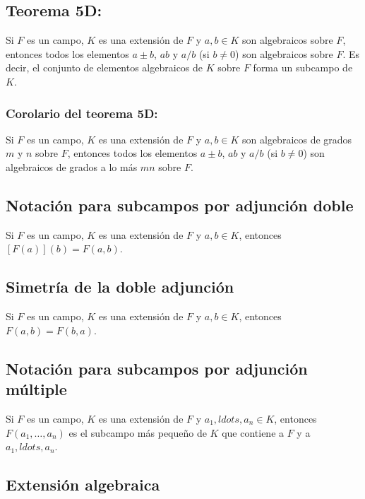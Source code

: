 \documentclass{article}
\begin{document}
\subsection*{\color{red} Teorema 5D:}

Si $F$ es un campo, $K$ es una extensión de $F$ y $a,b\in K$ son algebraicos sobre $F$, entonces todos los elementos $a\pm b$, $ab$ y $a/b$ (si $b\neq0$) son algebraicos sobre $F$. Es decir, el conjunto de elementos algebraicos de $K$ sobre $F$ forma un subcampo de $K$.

\subsubsection*{\color{red} Corolario del teorema 5D:}

Si $F$ es un campo, $K$ es una extensión de $F$ y $a,b\in K$ son algebraicos de grados $m$ y $n$ sobre $F$, entonces todos los elementos $a\pm b$, $ab$ y $a/b$ (si $b\neq0$) son algebraicos de grados a lo más $mn$ sobre $F$.

\subsection*{\color{teal} Notación para subcampos por adjunción doble}

Si $F$ es un campo, $K$ es una extensión de $F$ y $a,b\in K$, entonces $[F(a)](b)=F(a,b)$.

\subsection*{\color{purple} Simetría de la doble adjunción}

Si $F$ es un campo, $K$ es una extensión de $F$ y $a,b\in K$, entonces $F(a,b)=F(b,a)$.

\subsection*{\color{teal} Notación para subcampos por adjunción múltiple}

Si $F$ es un campo, $K$ es una extensión de $F$ y $a_1,ldots,a_n\in K$, entonces $F(a_1,\ldots,a_n)$ es el subcampo más pequeño de $K$ que contiene a $F$ y a $a_1,ldots,a_n$.

\subsection*{\color{violet} Extensión algebraica}
\end{document}
